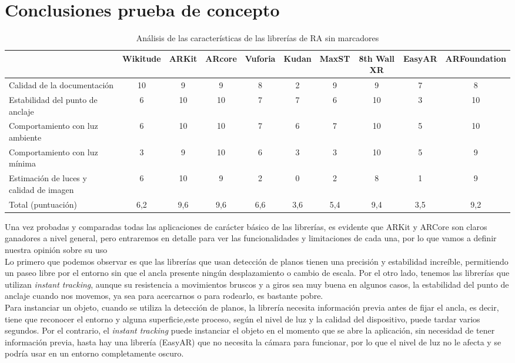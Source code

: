 \section{Conclusiones prueba de concepto}
\begin{table}[H]
\resizebox{\textwidth}{!} {
    \centering
    \begin{tabular}{|m{3cm}|c|c|c|c|c|c|c|c|c|}
    \hline
    &Wikitude&	ARKit &	ARcore & Vuforia & Kudan &	MaxST  & 8th Wall XR & EasyAR & ARFoundation\\
     \hline
         Calidad de la documentación 	& 10 & 9 & 9 & 8 &2 & 9 & 9 &  7 & 8 \\
  \hline
Estabilidad del punto de anclaje 		& 6 & 10 & 10 & 7 & 7 & 6 &  10  & 3 & 10 \\
 \hline
Comportamiento con luz ambiente   & 6 & 10 & 10& 7 & 6 & 7 & 10  & 5 & 10\\
 \hline
Comportamiento con luz mínima     & 3 &  9 & 10 & 6 & 3 & 3& 10 & 5 & 9\\
 \hline
Estimación de luces y calidad de imagen & 6 & 10 & 9 & 2  & 0  & 2 & 8 & 1 &9\\
 \hline
Total (puntuación) & 6,2 & 9,6 & 9,6  & 6,6 &    3,6   &   5,4     &  9,4     &     3,5        &  9,2          \\
\hline
    \end{tabular}
}
    \caption{Análisis de las características de las librerías de RA sin marcadores}
    \label{tab:my_label}
\end{table}

Una vez probadas y comparadas todas las aplicaciones de carácter básico de las librerías, es evidente que ARKit y ARCore son claros ganadores a nivel general, pero entraremos en detalle para ver las funcionalidades y limitaciones de cada una, por lo que vamos a definir nuestra opinión sobre su uso\\

Lo primero que podemos observar es que las librerías que usan detección de planos tienen una precisión y estabilidad increíble, permitiendo un paseo libre por el entorno sin que el ancla presente ningún desplazamiento o cambio de escala. Por el otro lado, tenemos las librerías que utilizan \textit{instant tracking}, aunque su resistencia a movimientos bruscos y a giros sea muy buena en algunos casos, la estabilidad del punto de anclaje cuando nos movemos, ya sea para acercarnos o para rodearlo, es bastante pobre.\\

Para instanciar un objeto, cuando se utiliza la detección de planos, la librería necesita información previa antes de fijar el ancla, es decir, tiene que reconocer el entorno y alguna superficie,este proceso, según el nivel de luz y la calidad del dispositivo, puede tardar varios segundos. Por el contrario, el \textit{instant tracking} puede instanciar el objeto en el momento que se abre la aplicación, sin necesidad de tener información previa, hasta hay una librería (EasyAR) que no necesita la cámara para funcionar, por lo que el nivel de luz no le afecta y se podría usar en un entorno completamente oscuro.\\

